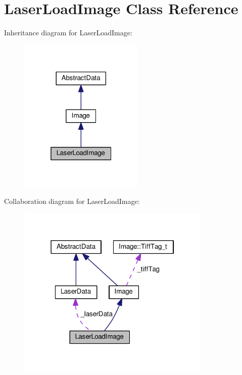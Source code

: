 \hypertarget{classLaserLoadImage}{}\section{Laser\+Load\+Image Class Reference}
\label{classLaserLoadImage}


Inheritance diagram for Laser\+Load\+Image\+:\nopagebreak
\begin{figure}[H]
\begin{center}
\leavevmode
\includegraphics[width=169pt]{classLaserLoadImage__inherit__graph}
\end{center}
\end{figure}


Collaboration diagram for Laser\+Load\+Image\+:\nopagebreak
\begin{figure}[H]
\begin{center}
\leavevmode
\includegraphics[width=262pt]{classLaserLoadImage__coll__graph}
\end{center}
\end{figure}
